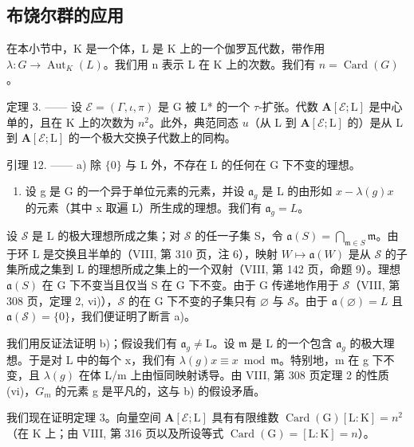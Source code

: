 \subsection{布饶尔群的应用}

在本小节中，K 是一个体，L 是 K 上的一个伽罗瓦代数，带作用 \(\lambda: G \to \operatorname{Aut}_{K}(L)\)。我们用 n 表示 L 在 K 上的次数。我们有 \(n = \operatorname{Card}(G)\)。

定理 3. —— 设 \(\mathcal{E} = (\Gamma, \iota, \pi)\) 是 G 被 L* 的一个 \(\tau\)-扩张。代数 \(\mathbf{A}[\mathcal{E}; \mathrm{L}]\) 是中心单的，且在 K 上的次数为 \(n^2\)。此外，典范同态 \(u\)（从 L 到 \(\mathbf{A}[\mathcal{E}; \mathrm{L}]\) 的）是从 L 到 \(\mathbf{A}[\mathcal{E}; \mathrm{L}]\) 的一个极大交换子代数上的同构。

引理 12. —— a) 除 \(\{0\}\) 与 L 外，不存在 L 的任何在 G 下不变的理想。

\begin{enumerate}
\def\labelenumi{\alph{enumi})}
\setcounter{enumi}{1}
\tightlist
\item
  设 g 是 G 的一个异于单位元素的元素，并设 \(\mathfrak{a}_{g}\) 是 L 的由形如 \(x - \lambda(g)x\) 的元素（其中 x 取遍 L）所生成的理想。我们有 \(\mathfrak{a}_{g} = L\)。
\end{enumerate}

设 \(\mathscr{S}\) 是 L 的极大理想所成之集；对 \(\mathscr{S}\) 的任一子集 S，令 \(\mathfrak{a}(S) = \bigcap_{\mathfrak{m} \in S} \mathfrak{m}\)。由于环 L 是交换且半单的（VIII, 第 310 页，注 6），映射 \(W \mapsto \mathfrak{a}(W)\) 是从 \(\mathscr{S}\) 的子集所成之集到 L 的理想所成之集上的一个双射（VIII, 第 142 页，命题 9）。理想 \(\mathfrak{a}(S)\) 在 G 下不变当且仅当 S 在 G 下不变。由于 G 传递地作用于 \(\mathscr{S}\)（VIII, 第 308 页，定理 2, vi)），\(\mathscr{S}\) 的在 G 下不变的子集只有 \(\varnothing\) 与 \(\mathscr{S}\)。由于 \(\mathfrak{a}(\varnothing) = L\) 且 \(\mathfrak{a}(\mathscr{S}) = \{0\}\)，我们便证明了断言 a)。

我们用反证法证明 b)；假设我们有 \(\mathfrak{a}_g\neq \mathrm{L}\)。设 \(\mathfrak{m}\) 是 L 的一个包含 \(\mathfrak{a}_g\) 的极大理想。于是对 L 中的每个 x，我们有 \(\lambda (g)x\equiv x\bmod \mathfrak{m}\)。特别地，m 在 g 下不变，且 \(\lambda(g)\) 在体 L/m 上由恒同映射诱导。由 VIII, 第 308 页定理 2 的性质 (vi)，\(G_{m}\) 的元素 g 是平凡的，这与 b) 的假设矛盾。

我们现在证明定理 3。向量空间 \(\mathbf{A}[\mathcal{E};\mathrm{L}]\) 具有有限维数 \(\operatorname{Card}(\mathrm{G})[\mathrm{L}:\mathrm{K}] = n^2\)（在 \(\mathrm{K}\) 上；由 VIII, 第 316 页以及所设等式 \(\operatorname{Card}(\mathrm{G}) = [\mathrm{L}:\mathrm{K}] = n\)）。

